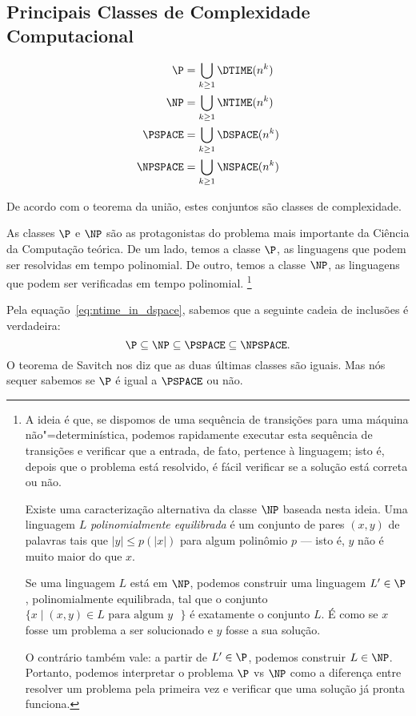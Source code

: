 \subsection{Principais Classes de Complexidade Computacional}
\label{sec:standard_classes}

\begin{definition}
    \begin{align*}
        \P &= \bigcup_{k \geq 1} \DTIME(n^k) \\
        \NP &= \bigcup_{k \geq 1} \NTIME(n^k) \\
        \PSPACE &= \bigcup_{k \geq 1} \DSPACE(n^k) \\
        \NPSPACE &= \bigcup_{k \geq 1} \NSPACE(n^k) \\
    \end{align*}
\end{definition}

De acordo com o teorema da união,
estes conjuntos são classes de complexidade.

As classes $\P$ e $\NP$ são as protagonistas
do problema mais importante da Ciência da Computação teórica.
De um lado, temos a classe $\P$,
as linguagens que podem ser resolvidas em tempo polinomial.
De outro, temos a classe $\NP$,
as linguagens que podem ser verificadas em tempo polinomial.%
\footnote{
    \label{foot:polinomially_balanced}
    A ideia é que,
    se dispomos de uma sequência de transições para uma máquina não"=determinística,
    podemos rapidamente executar esta sequência de transições
    e verificar que a entrada, de fato, pertence à linguagem;
    isto é, depois que o problema está resolvido,
    é fácil verificar se a solução está correta ou não.

    Existe uma caracterização alternativa da classe $\NP$ baseada nesta ideia.
    Uma linguagem $L$ \emph{polinomialmente equilibrada}
    é um conjunto de pares $(x, y)$ de palavras
    tais que $|y| \leq p(|x|)$ para algum polinômio $p$
    \cite[p.~298]{Papadimitriou1998}
    --- isto é, $y$ não é muito maior do que $x$.

    Se uma linguagem $L$ está em $\NP$,
    podemos construir uma linguagem $L' \in \P$,
    polinomialmente equilibrada,
    tal que o conjunto $\{x \mid (x, y) \in L \text{ para algum $y$ }\}$
    é exatamente o conjunto $L$.
    É como se $x$ fosse um problema a ser solucionado
    e $y$ fosse a sua solução.

    O contrário também vale: a partir de $L' \in \P$,
    podemos construir $L \in \NP$.
    Portanto, podemos interpretar o problema $\P$ vs $\NP$
    como a diferença entre resolver um problema pela primeira vez
    e verificar que uma solução já pronta funciona.
}

Pela equação~\ref{eq:ntime_in_dspace},
sabemos que a seguinte cadeia de inclusões é verdadeira:
\begin{equation*}
    \P \subseteq \NP \subseteq \PSPACE \subseteq \NPSPACE.
\end{equation*}
O teorema de Savitch nos diz que as duas últimas classes são iguais.
Mas nós sequer sabemos se $\P$ é igual a $\PSPACE$ ou não.
